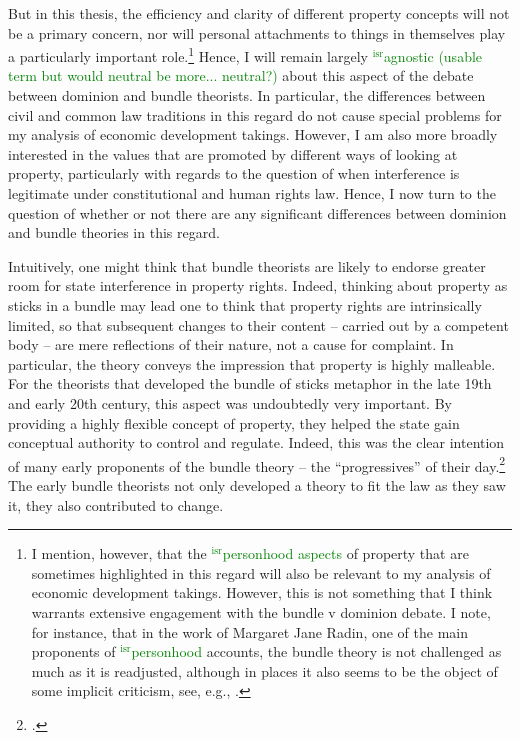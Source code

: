 \documentclass[12pt,a4paper]{book} %
\newcommand{\isr}[1]{\textcolor{green}{$^{\textrm{isr}}${#1}}}
\begin{document}
But in this thesis, the efficiency and clarity of different property concepts will not be a primary concern, nor will personal attachments to things in themselves play a particularly important role.\footnote{I mention, however, that the \isr{personhood aspects} of property that are sometimes highlighted in this regard will also be relevant to my analysis of economic development takings. However, this is not something that I think warrants extensive engagement with the bundle v dominion debate. I note, for instance, that in the work of Margaret Jane Radin, one of the main proponents of \isr{personhood} accounts, the bundle theory is not challenged as much as it is readjusted, although in places it also seems to be the object of some implicit criticism, see, e.g., \cite[127-130]{radin93}.}
Hence, I will remain largely \isr{agnostic (usable term but would neutral be more... neutral?)} about this aspect of the debate between dominion and bundle theorists. In particular, the differences between civil and common law traditions in this regard do not cause special problems for my analysis of economic development takings. However, I am also more broadly interested in the values that are promoted by different ways of looking at property, particularly with regards to the question of when interference is legitimate under constitutional and human rights law. Hence, I  now turn to the question of whether or not there are any significant differences between dominion and bundle theories in this regard.

Intuitively, one might think that bundle theorists are likely to endorse greater room for state interference in property rights. Indeed, thinking about property as sticks in a bundle may lead one to think that property rights are intrinsically limited, so that subsequent changes to their content -- carried out by a competent body -- are mere reflections of their nature, not a cause for complaint. In particular, the theory conveys the impression that property is highly malleable. For the theorists that developed the bundle of sticks metaphor in the late 19th and early 20th century, this aspect was undoubtedly very important. By providing a highly flexible concept of property, they helped the state gain conceptual authority to control and regulate. Indeed, this was the clear intention of many early proponents of the bundle theory -- the ``progressives'' of their day.\footcite[195]{klein11} The early bundle theorists not only developed a theory to fit the law as they saw it, they also contributed to change.
\end{document}
